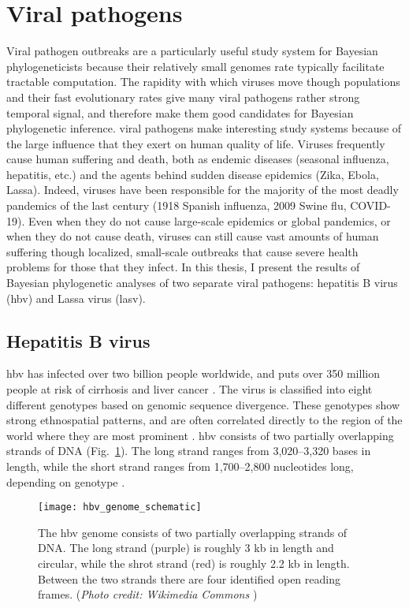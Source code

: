 \section{Viral pathogens}
Viral pathogen outbreaks are a particularly useful study system for Bayesian phylogeneticists because their relatively small genomes rate typically facilitate tractable computation.
The rapidity with which viruses move though populations and their fast evolutionary rates give many viral pathogens rather strong temporal signal, and therefore make them good candidates for Bayesian phylogenetic inference.
viral pathogens make interesting study systems because of the large influence that they exert on human quality of life.
Viruses frequently cause human suffering and death, both as endemic diseases (seasonal influenza, hepatitis, etc.) and the agents behind sudden disease epidemics (Zika, Ebola, Lassa).
Indeed, viruses have been responsible for the majority of the most deadly pandemics of the last century (1918 Spanish influenza, 2009 Swine flu, COVID-19).
Even when they do not cause large-scale epidemics or global pandemics, or when they do not cause death, viruses can still cause vast amounts of human suffering though localized, small-scale outbreaks that cause severe health problems for those that they infect.
In this thesis, I present the results of Bayesian phylogenetic analyses of two separate viral pathogens: hepatitis B virus (\gls{hbv}) and Lassa virus (\gls{lasv}).


\subsection{Hepatitis B virus}

\gls{hbv} has infected over two billion people worldwide, and puts over 350 million people at risk of cirrhosis and liver cancer \cite{kane1995global}.
The virus is classified into eight different genotypes based on genomic sequence divergence.
These genotypes show strong ethnospatial patterns, and are often correlated directly to the region of the world where they are most prominent \cite{schaefer2007hepatitis}.
\gls{hbv} consists of two partially overlapping strands of DNA (Fig.~\ref{fig:hbvGenome}).
The long strand ranges from 3,020--3,320 bases in length, while the short strand ranges from 1,700--2,800 nucleotides long, depending on genotype \cite{kay2007hepatitis}.

\begin{figure}[ht]
  \centering
  \medskip
  \texttt{[image: hbv\_genome\_schematic]}
  \caption[Scematic of the HBV genome]{The \gls{hbv} genome consists of two partially overlapping strands of DNA. The long strand (purple) is roughly 3 kb in length and circular, while the shrot strand (red) is roughly 2.2 kb in length. Between the two strands there are four identified open reading frames. (\textit{Photo credit: Wikimedia Commons} \cite{HBVwiki})}
  \label{fig:hbvGenome}
\end{figure}

